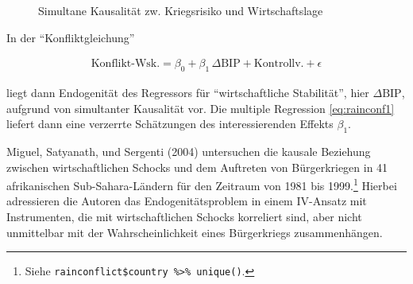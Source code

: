 \documentclass[
  a4paper,
  DIV=11,
  oneside]{scrreprt}
\begin{document}
\begin{figure}[t]


\caption{\label{fig-IVDAGrain1}Simultane Kausalität zw. Kriegsrisiko und
Wirtschaftslage}

\end{figure}%

In der ``Konfliktgleichung''

\begin{align}
  \text{Konflikt-Wsk.} = \beta_0 + \beta_1\, \Delta\text{BIP} + \text{Kontrollv.} + \epsilon\label{eq:rainconf1}
\end{align}

liegt dann Endogenität des Regressors für ``wirtschaftliche
Stabilität'', hier \(\Delta\text{BIP}\), aufgrund von simultanter
Kausalität vor. Die multiple Regression \eqref{eq:rainconf1} liefert
dann eine verzerrte Schätzungen des interessierenden Effekts
\(\beta_1\).

Miguel, Satyanath, und Sergenti (2004) untersuchen die kausale Beziehung
zwischen wirtschaftlichen Schocks und dem Auftreten von Bürgerkriegen in
41 afrikanischen Sub-Sahara-Ländern für den Zeitraum von 1981 bis
1999.\footnote{Siehe
  \texttt{rainconflict\$country\ \%\textgreater{}\%\ unique()}.} Hierbei
adressieren die Autoren das Endogenitätsproblem in einem IV-Ansatz mit
Instrumenten, die mit wirtschaftlichen Schocks korreliert sind, aber
nicht unmittelbar mit der Wahrscheinlichkeit eines Bürgerkriegs
zusammenhängen.
\end{document}
